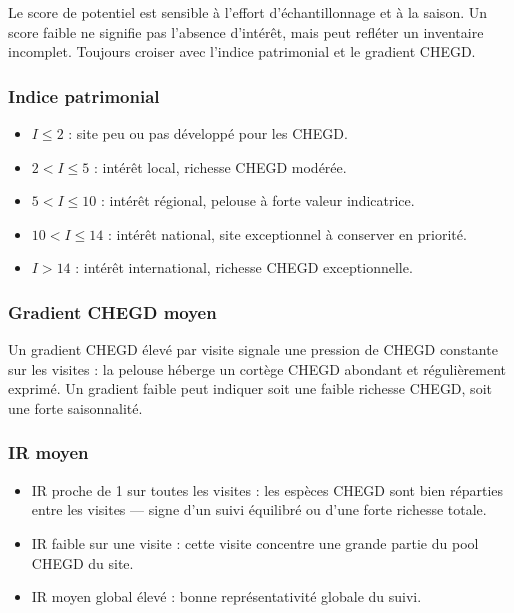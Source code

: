 \documentclass[11pt,a4paper]{article}
\begin{document}
\begin{warnbox}[Important]
  Le score de potentiel est sensible à l'effort d'échantillonnage et à la saison.
  Un score faible ne signifie pas l'absence d'intérêt, mais peut refléter un inventaire incomplet.
  Toujours croiser avec l'indice patrimonial et le gradient CHEGD.
\end{warnbox}

\subsubsection{Indice patrimonial}

\begin{itemize}
  \item $I \leq 2$ : site peu ou pas développé pour les CHEGD.
  \item $2 < I \leq 5$ : intérêt local, richesse CHEGD modérée.
  \item $5 < I \leq 10$ : intérêt régional, pelouse à forte valeur indicatrice.
  \item $10 < I \leq 14$ : intérêt national, site exceptionnel à conserver en priorité.
  \item $I > 14$ : intérêt international, richesse CHEGD exceptionnelle.
\end{itemize}

\subsubsection{Gradient CHEGD moyen}

Un gradient CHEGD élevé par visite signale une pression de CHEGD constante sur les visites :
la pelouse héberge un cortège CHEGD abondant et régulièrement exprimé. Un gradient faible
peut indiquer soit une faible richesse CHEGD, soit une forte saisonnalité.

\subsubsection{IR moyen}

\begin{itemize}
  \item IR proche de 1 sur toutes les visites : les espèces CHEGD sont bien réparties entre les visites — signe d'un suivi équilibré ou d'une forte richesse totale.
  \item IR faible sur une visite : cette visite concentre une grande partie du pool CHEGD du site.
  \item IR moyen global élevé : bonne représentativité globale du suivi.
\end{itemize}
\end{document}
